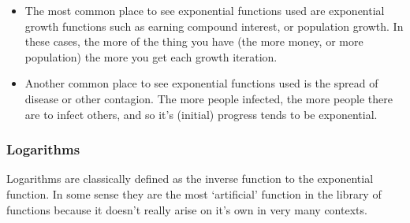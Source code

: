 \documentclass{ximera}
\begin{document}
\begin{description}
            \begin{itemize}
                \item The most common place to see exponential functions used are exponential growth functions such as earning compound interest, or population growth. In these cases, the more of the thing you have (the more money, or more population) the more you get each growth iteration. 
                \item Another common place to see exponential functions used is the spread of disease or other contagion. The more people infected, the more people there are to infect others, and so it's (initial) progress tends to be exponential.
            \end{itemize}
        \end{description}
    
    
    
    
    \subsubsection*{Logarithms}
        Logarithms are classically defined as the inverse function to the exponential function. In some sense they are the most `artificial' function in the library of functions because it doesn't really arise on it's own in very many contexts.
        
\end{document}
